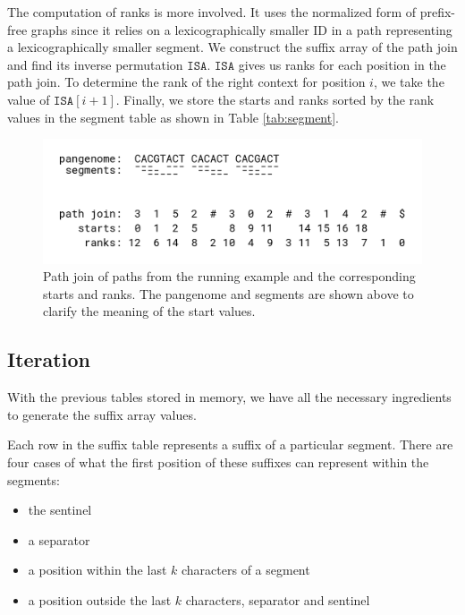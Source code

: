The computation of ranks is more involved.
It uses the normalized form of prefix-free graphs since it relies on a lexicographically smaller ID in a path representing a lexicographically smaller segment.
We construct the suffix array of the path join and find its inverse permutation $\texttt{ISA}$.
$\texttt{ISA}$ gives us ranks for each position in the path join.
To determine the rank of the right context for position $i$, we take
the value of $\texttt{ISA}[i+1]$.
Finally, we store the starts and ranks sorted by the rank values in the segment table as shown in Table \ref{tab:segment}.

\begin{figure}
    \centering
    \includegraphics[width=\linewidth]{images/path_join.png}
    \caption{
        Path join of paths from the running example and the corresponding starts and ranks. The pangenome and segments are shown above to clarify the meaning of the start values.
    }
    \label{fig:path_join}
\end{figure}



\subsection{Iteration}
With the previous tables stored in memory, we have all the necessary ingredients to generate the suffix array values.

Each row in the suffix table represents a suffix of a particular segment.
There are four cases of what the first position of these suffixes can represent within the segments:
\begin{itemize}
    \item the sentinel
    \item a separator
    \item a position within the last $k$ characters of a segment
    \item a position outside the last $k$ characters, separator and sentinel
\end{itemize}

